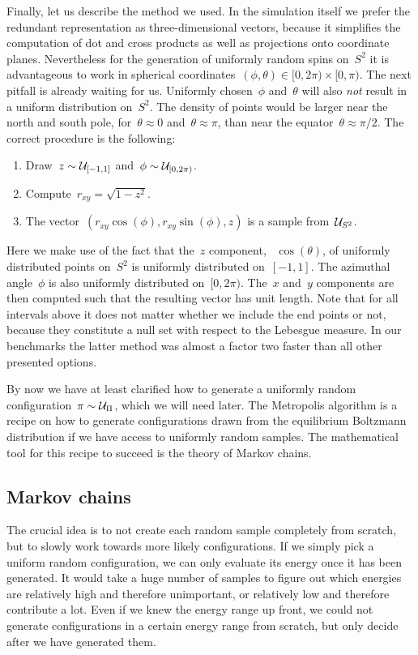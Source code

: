 Finally, let us describe the method we used. In the simulation itself we prefer
the redundant representation as three-dimensional vectors, because it simplifies
the computation of dot and cross products as well as projections onto coordinate
planes. Nevertheless for the generation of uniformly random spins on~$S^2$ it is
advantageous to work in spherical coordinates~$(\phi, \theta) \in [0,2\pi)
\times [0,\pi)$. The next pitfall is already waiting for us. Uniformly
chosen~$\phi$ and~$\theta$ will also \emph{not} result in a uniform distribution
on~$S^2$. The density of points would be larger near the north and south pole,
\ie{} for~$\theta \approx 0$ and~$\theta \approx \pi$, than near the
equator~$\theta \approx \pi/2$. The correct procedure is the following:
%
\begin{enumerate}
  \item Draw~$z \sim \mathcal{U}_{[-1,1]}$ and~$\phi \sim \mathcal{U}_{[0,2\pi)}$.
  \item Compute~$r_{xy} = \sqrt{1 - z^2}$.
  \item The vector~$(r_{xy} \cos(\phi), r_{xy} \sin(\phi), z)$ is a sample
    from~$\mathcal{U}_{S^2}$.
\end{enumerate}
%
Here we make use of the fact that the~$z$ component, \ie{}~$\cos(\theta)$, of
uniformly distributed points on~$S^2$ is uniformly distributed on~$[-1,1]$. The
azimuthal angle~$\phi$ is also uniformly distributed on~$[0,2\pi)$. The~$x$
and~$y$ components are then computed such that the resulting vector has unit
length. Note that for all intervals above it does not matter whether we include
the end points or not, because they constitute a null set with respect to the
Lebesgue measure. In our benchmarks the latter method was almost a factor two
faster than all other presented options.

By now we have at least clarified how to generate a uniformly random
configuration~$\pi \sim \mathcal{U}_{\Pi}$, which we will need later. The Metropolis
algorithm is a recipe on how to generate configurations drawn from the
equilibrium Boltzmann distribution if we have access to uniformly random
samples. The mathematical tool for this recipe to succeed is the theory of
Markov chains.

\subsection{Markov chains}

The crucial idea is to not create each random sample completely from scratch,
but to slowly work towards more likely configurations. If we simply pick a
uniform random configuration, we can only evaluate its energy once it has been
generated. It would take a huge number of samples to figure out which energies
are relatively high and therefore unimportant, or relatively low and therefore
contribute a lot. Even if we knew the energy range up front, we could not
generate configurations in a certain energy range from scratch, but only decide
after we have generated them.

